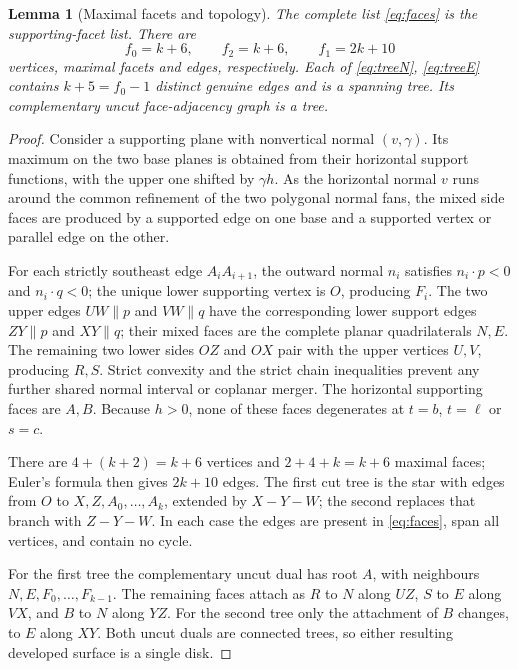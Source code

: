 \documentclass[11pt]{amsart}
\newtheorem{lemma}[theorem]{Lemma}
\begin{document}
\begin{lemma}[Maximal facets and topology]\label{lem:faces}
The complete list \eqref{eq:faces} is the supporting-facet list. There are
\[
 f_0=k+6,\qquad f_2=k+6,\qquad f_1=2k+10
\]
vertices, maximal facets and edges, respectively. Each of \eqref{eq:treeN}, \eqref{eq:treeE} contains \(k+5=f_0-1\) distinct genuine edges and is a spanning tree. Its complementary uncut face-adjacency graph is a tree.
\end{lemma}
\begin{proof}
Consider a supporting plane with nonvertical normal \((v,\gamma)\). Its maximum on the two base planes is obtained from their horizontal support functions, with the upper one shifted by \(\gamma h\). As the horizontal normal \(v\) runs around the common refinement of the two polygonal normal fans, the mixed side faces are produced by a supported edge on one base and a supported vertex or parallel edge on the other.

For each strictly southeast edge \(A_iA_{i+1}\), the outward normal \(n_i\) satisfies \(n_i\cdot p<0\) and \(n_i\cdot q<0\); the unique lower supporting vertex is \(O\), producing \(F_i\). The two upper edges \(UW\parallel p\) and \(VW\parallel q\) have the corresponding lower support edges \(ZY\parallel p\) and \(XY\parallel q\); their mixed faces are the complete planar quadrilaterals \(N,E\). The remaining two lower sides \(OZ\) and \(OX\) pair with the upper vertices \(U,V\), producing \(R,S\). Strict convexity and the strict chain inequalities prevent any further shared normal interval or coplanar merger. The horizontal supporting faces are \(A,B\). Because \(h>0\), none of these faces degenerates at \(t=b\), \(t=\ell\) or \(s=c\).

There are \(4+(k+2)=k+6\) vertices and \(2+4+k=k+6\) maximal faces; Euler's formula then gives \(2k+10\) edges. The first cut tree is the star with edges from \(O\) to \(X,Z,A_0,\ldots,A_k\), extended by \(X-Y-W\); the second replaces that branch with \(Z-Y-W\). In each case the edges are present in \eqref{eq:faces}, span all vertices, and contain no cycle.

For the first tree the complementary uncut dual has root \(A\), with neighbours \(N,E,F_0,\ldots,F_{k-1}\). The remaining faces attach as \(R\) to \(N\) along \(UZ\), \(S\) to \(E\) along \(VX\), and \(B\) to \(N\) along \(YZ\). For the second tree only the attachment of \(B\) changes, to \(E\) along \(XY\). Both uncut duals are connected trees, so either resulting developed surface is a single disk.
\end{proof}
\end{document}

